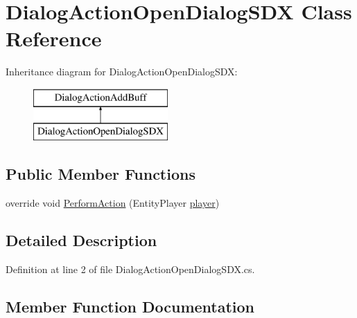 \hypertarget{class_dialog_action_open_dialog_s_d_x}{}\section{Dialog\+Action\+Open\+Dialog\+S\+DX Class Reference}
\label{class_dialog_action_open_dialog_s_d_x}
Inheritance diagram for Dialog\+Action\+Open\+Dialog\+S\+DX\+:\begin{figure}[H]
\begin{center}
\leavevmode
\includegraphics[height=2.000000cm]{class_dialog_action_open_dialog_s_d_x}
\end{center}
\end{figure}
\subsection*{Public Member Functions}
\begin{DoxyCompactItemize}
\item 
override void \mbox{\hyperlink{class_dialog_action_open_dialog_s_d_x_a41454fe01c90cff4a125e05b90801566}{Perform\+Action}} (Entity\+Player \mbox{\hyperlink{_sphere_i_i_01_music_01_boxes_2_config_2_localization_8txt_a4e2cb8aeff651600ea1cc57fe5a929a4}{player}})
\end{DoxyCompactItemize}


\subsection{Detailed Description}


Definition at line 2 of file Dialog\+Action\+Open\+Dialog\+S\+D\+X.\+cs.



\subsection{Member Function Documentation}
\mbox{\label{class_dialog_action_open_dialog_s_d_x_a41454fe01c90cff4a125e05b90801566}} 
